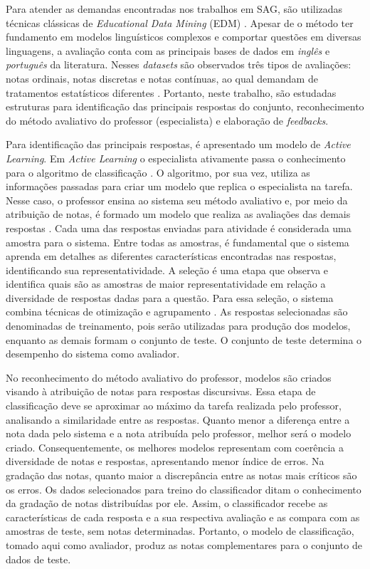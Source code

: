 Para atender as demandas encontradas nos trabalhos em SAG, são utilizadas técnicas clássicas de \textit{Educational Data Mining} (EDM) \cite{romero2010}. Apesar de o método ter fundamento em modelos linguísticos complexos e comportar questões em diversas linguagens, a avaliação conta com as principais bases de dados em \textit{inglês} e \textit{português} da literatura. Nesses \textit{datasets} são observados três tipos de avaliações: notas ordinais, notas discretas e notas contínuas, ao qual demandam de tratamentos estatísticos diferentes \cite{morettin2010}. Portanto, neste trabalho, são estudadas estruturas para identificação das principais respostas do conjunto, reconhecimento do método avaliativo do professor (especialista) e elaboração de \textit{feedbacks}.

Para identificação das principais respostas, é apresentado um modelo de \textit{Active Learning}. Em \textit{Active Learning} o especialista ativamente passa o conhecimento para o algoritmo de classificação \cite{silva2007, miller2020}. O algoritmo, por sua vez, utiliza as informações passadas para criar um modelo que replica o especialista na tarefa. Nesse caso, o professor ensina ao sistema seu método avaliativo e, por meio da atribuição de notas, é formado um modelo que realiza as avaliações das demais respostas \cite{romero2010}. Cada uma das respostas enviadas para atividade é considerada uma amostra para o sistema. Entre todas as amostras, é fundamental que o sistema aprenda em detalhes as diferentes características encontradas nas respostas, identificando sua representatividade. A seleção é uma etapa que observa e identifica quais são as amostras de maior representatividade em relação a diversidade de respostas dadas para a questão. Para essa seleção, o sistema combina técnicas de otimização e agrupamento \cite{everitt2011, spalenza2019}. As respostas selecionadas são denominadas de treinamento, pois serão utilizadas para produção dos modelos, enquanto as demais formam o conjunto de teste. O conjunto de teste determina o desempenho do sistema como avaliador.

No reconhecimento do método avaliativo do professor, modelos são criados visando à atribuição de notas para respostas discursivas. Essa etapa de classificação deve se aproximar ao máximo da tarefa realizada pelo professor, analisando a similaridade entre as respostas. Quanto menor a diferença entre a nota dada pelo sistema e a nota atribuída pelo professor, melhor será o modelo criado. Consequentemente, os melhores modelos representam com coerência a diversidade de notas e respostas, apresentando menor índice de erros. Na gradação das notas, quanto maior a discrepância entre as notas mais críticos são os erros. Os dados selecionados para treino do classificador ditam o conhecimento da gradação de notas distribuídas por ele. Assim, o classificador recebe as características de cada resposta e a sua respectiva avaliação e as compara com as amostras de teste, sem notas determinadas. Portanto, o modelo de classificação, tomado aqui como avaliador, produz as notas complementares para o conjunto de dados de teste.


